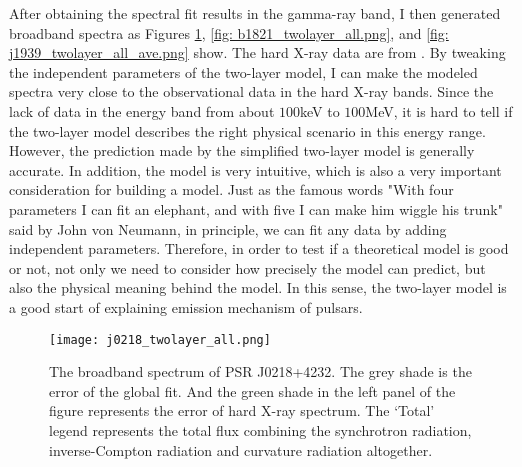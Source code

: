 \documentclass[a4paper, 12pt]{report}
\newcommand{\change}[1]{
  $<$\colorbox{red}{\textbf{change}}$>$#1$<$\colorbox{red}{\textbf{/change}}$>$
}
\begin{document}
    \begin{table}[!htp]
      \centering
      \caption[The results of fit parameters for the three MSPs.]
        {The results of fit parameters for the three MSPs. The physical 
        meaning of each parameter is consistent with the two-layer model described above.}
      \label{table: twolayer_fit_parameter}
    \end{table}
    \vspace{0.5cm}
          
    After obtaining the spectral fit results in the gamma-ray band, I then generated 
    broadband spectra as Figures \ref{fig: j0218_twolayer_all.png}, 
    \ref{fig: b1821_twolayer_all.png}, and \ref{fig: j1939_twolayer_all_ave.png} show. 
    The hard X-ray data are from \cite{0004-637X-845-2-159}. By tweaking the independent 
    parameters of the two-layer model, I can make the modeled spectra 
    very close to the observational data in the hard X-ray bands. Since the lack of data in 
    the energy band from about $100$keV to $100$MeV, it is hard to tell if the two-layer model 
    describes the right physical scenario in this energy range. However, the prediction made 
    by the simplified two-layer model is generally accurate. In addition, the model is very 
    intuitive, which is also a very important consideration for building a model. Just as 
    the famous words "With four parameters I can fit an elephant, and with five I 
    can make him wiggle his trunk" 
    said by John von Neumann, in principle, we can fit any data by adding independent 
    parameters. Therefore, in order to test if a theoretical model is good or not, not only we 
    need to consider how precisely the model can predict, but also the physical meaning 
    behind the model. In this sense, the two-layer model is a good start of explaining 
    emission mechanism of pulsars. 
    
    \begin{figure}[!htp]
      \centering 
      \texttt{[image: j0218\_twolayer\_all.png]}
      \caption[The broadband spectrum of PSR J0218+4232.]
        {The broadband spectrum of PSR J0218+4232.
        The grey shade is the error of the global fit. And the green shade in the left panel of 
        the figure represents the error of hard X-ray spectrum. The `Total' legend represents the 
        total flux combining the synchrotron radiation, inverse-Compton radiation and curvature 
        radiation altogether.}
      \label{fig: j0218_twolayer_all.png}
    \end{figure}
\end{document}
